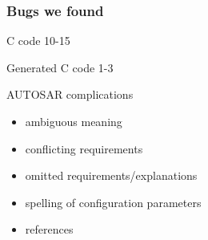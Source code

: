 \documentclass{beamer}
\begin{document}
\begin{frame}
  \frametitle{Bugs we found}
  \begin{block}{C code}
    10-15
  \end{block}

  \begin{block}{Generated C code}
    1-3
  \end{block}

  \begin{block}{AUTOSAR complications}
    \begin{itemize}
      \item ambiguous meaning
      \item conflicting requirements
      \item omitted requirements/explanations
      \item spelling of configuration parameters
      \item references
    \end{itemize}
  \end{block}

\end{frame}

\end{document}
